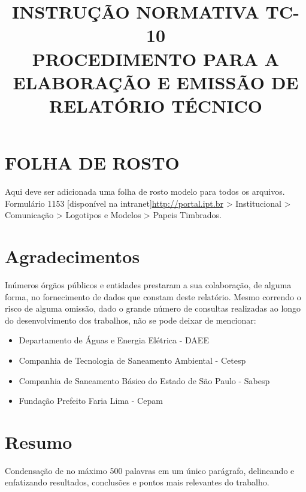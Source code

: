 \documentclass{article}
\begin{document}
\begin{titlepage}
\title{INSTRUÇÃO NORMATIVA TC-10 \\ PROCEDIMENTO PARA A ELABORAÇÃO E EMISSÃO DE RELATÓRIO TÉCNICO}
\maketitle
\end{titlepage}

\setcounter{page}{1}

\section*{FOLHA DE ROSTO}
Aqui deve ser adicionada uma folha de rosto modelo para todos os arquivos. Formulário 1153 [disponível na intranet]\url{http://portal.ipt.br} > Institucional > Comunicação > Logotipos e Modelos > Papeis Timbrados.
\newpage

\section*{Agradecimentos}
Inúmeros órgãos públicos e entidades prestaram a sua colaboração, de alguma forma, no fornecimento de dados que constam deste relatório. Mesmo correndo o risco de alguma omissão, dado o grande número de consultas realizadas ao longo do desenvolvimento dos trabalhos, não se pode deixar de mencionar:
\begin{itemize}
    \item Departamento de Águas e Energia Elétrica - DAEE
    \item Companhia de Tecnologia de Saneamento Ambiental - Cetesp
    \item Companhia de Saneamento Básico do Estado de São Paulo - Sabesp
    \item Fundação Prefeito Faria Lima - Cepam
\end{itemize}
\newpage

\section*{Resumo}
Condensação de no máximo 500 palavras em um único parágrafo, delineando e enfatizando resultados, conclusões e pontos mais relevantes do trabalho.
\newpage

\tableofcontents
\newpage
\end{document}

